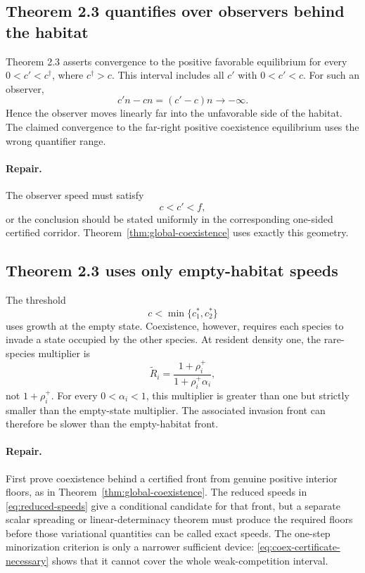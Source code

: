 \documentclass[11pt]{article}
\theoremstyle{definition}
\begin{document}
\subsection{Theorem 2.3 quantifies over observers behind the habitat}

Theorem 2.3 asserts convergence to the positive favorable equilibrium for
every \(0<c'<c^\dagger\), where \(c^\dagger>c\).  This interval includes all
\(c'\) with \(0<c'<c\).  For such an observer,
\[
  c'n-cn=(c'-c)n\longrightarrow-\infty.
\]
Hence the observer moves linearly far into the unfavorable side of the
habitat.  The claimed convergence to the far-right positive coexistence
equilibrium uses the wrong quantifier range.

\paragraph{Repair.}
The observer speed must satisfy
\[
  c<c'<f,
\]
or the conclusion should be stated uniformly in the corresponding
one-sided certified corridor.  Theorem~\ref{thm:global-coexistence} uses
exactly this geometry.

\subsection{Theorem 2.3 uses only empty-habitat speeds}

The threshold
\[
  c<\min\{c_1^*,c_2^*\}
\]
uses growth at the empty state.  Coexistence, however, requires each species
to invade a state occupied by the other species.  At resident density one,
the rare-species multiplier is
\[
  \widetilde R_i
  =
  \frac{1+\rho_i^+}{1+\rho_i^+\alpha_i},
\]
not \(1+\rho_i^+\).  For every
\(0<\alpha_i<1\), this multiplier is greater than one but strictly smaller
than the empty-state multiplier.  The associated invasion front can
therefore be slower than the empty-habitat front.

\paragraph{Repair.}
First prove coexistence behind a certified front from genuine positive
interior floors, as in Theorem~\ref{thm:global-coexistence}.  The reduced
speeds in \eqref{eq:reduced-speeds} give a conditional candidate for that
front, but a separate scalar spreading or linear-determinacy theorem must
produce the required floors before those variational quantities can be
called exact speeds.  The one-step minorization criterion is only a narrower
sufficient device: \eqref{eq:coex-certificate-necessary} shows that it cannot
cover the whole weak-competition interval.
\end{document}
